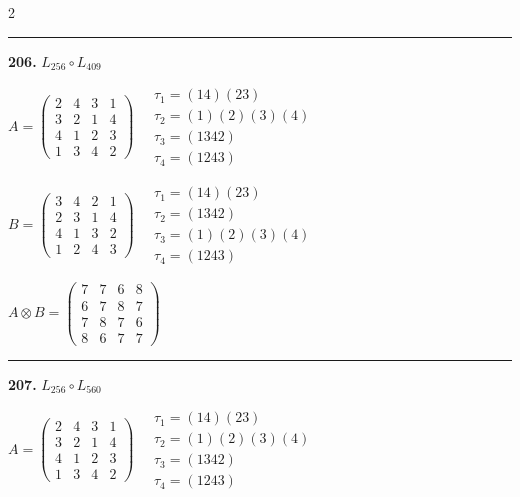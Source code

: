 \begin{multicols}{2}
\vspace{0.3em}
\hrule
\vspace{0.3em}

\noindent\textbf{206.} $L_{256} \circ L_{409}$

$A = \begin{pmatrix} 2 & 4 & 3 & 1 \\ 3 & 2 & 1 & 4 \\ 4 & 1 & 2 & 3 \\ 1 & 3 & 4 & 2 \end{pmatrix} \quad \begin{matrix} \tau_{1}=(1 4)(2 3) \\ \tau_{2}=(1)(2)(3)(4) \\ \tau_{3}=(1 3 4 2) \\ \tau_{4}=(1 2 4 3) \end{matrix}$

$B = \begin{pmatrix} 3 & 4 & 2 & 1 \\ 2 & 3 & 1 & 4 \\ 4 & 1 & 3 & 2 \\ 1 & 2 & 4 & 3 \end{pmatrix} \quad \begin{matrix} \tau_{1}=(1 4)(2 3) \\ \tau_{2}=(1 3 4 2) \\ \tau_{3}=(1)(2)(3)(4) \\ \tau_{4}=(1 2 4 3) \end{matrix}$

$A \otimes B = \begin{pmatrix} 7 & 7 & 6 & 8 \\ 6 & 7 & 8 & 7 \\ 7 & 8 & 7 & 6 \\ 8 & 6 & 7 & 7 \end{pmatrix}$

\vspace{0.3em}
\hrule
\vspace{0.3em}

\noindent\textbf{207.} $L_{256} \circ L_{560}$

$A = \begin{pmatrix} 2 & 4 & 3 & 1 \\ 3 & 2 & 1 & 4 \\ 4 & 1 & 2 & 3 \\ 1 & 3 & 4 & 2 \end{pmatrix} \quad \begin{matrix} \tau_{1}=(1 4)(2 3) \\ \tau_{2}=(1)(2)(3)(4) \\ \tau_{3}=(1 3 4 2) \\ \tau_{4}=(1 2 4 3) \end{matrix}$


\end{multicols}
